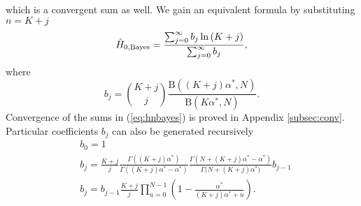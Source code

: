 which is a convergent sum as well. We gain an equivalent formula by substituting $n=K+j$ \begin{equation} 
\label{eq:hnbayesb}
\hat{H}_{0,\mbox{\scriptsize{Bayes}}} = \frac{\sum_{j=0}^{\infty}{b_{j}\ln{(K+j)}}}{\sum_{j=0}^{\infty}{b_j}},
\end{equation}
where
\begin{equation}
b_{j}= {K+j \choose j} \frac{\mathrm{B}\left( (K+j)\alpha^{*}, N \right)}{\mathrm{B}\left( K\alpha^{*}, N \right)}.
\end{equation} 
Convergence of the sums in (\ref{eq:hnbayes}) is proved in Appendix \ref{subsec:conv}. Particular coefficients $b_{j}$ can also be generated recursively
\begin{equation}
\label{eq:breform}
\begin{split}
& b_{0} = 1 \\
& b_{j} = \frac{K+j}{j} \frac{\Gamma{((K+j)\alpha^{*})}}{\Gamma{((K+j)\alpha^{*}-\alpha^{*})}}\frac{\Gamma{(N+(K+j)\alpha^{*} -\alpha^{*})}}{\Gamma({N+(K+j)\alpha^{*})}} b_{j-1} \\
& b_{j} = b_{j-1} \frac{K+j}{j}\prod_{u=0}^{N-1} \left(1 - \frac{\alpha^{*}}{(K+j)\alpha^{*}+u} \right).
\end{split}
\end{equation}
